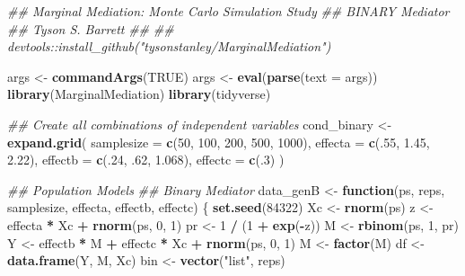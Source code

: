 \documentclass[]{DissertateCUNY}
\newenvironment{Shaded}{\begin{snugshade}}{\end{snugshade}}
\newcommand{\CommentTok}[1]{\textcolor[rgb]{0.56,0.35,0.01}{\textit{#1}}}
\newcommand{\ControlFlowTok}[1]{\textcolor[rgb]{0.13,0.29,0.53}{\textbf{#1}}}
\newcommand{\DataTypeTok}[1]{\textcolor[rgb]{0.13,0.29,0.53}{#1}}
\newcommand{\DecValTok}[1]{\textcolor[rgb]{0.00,0.00,0.81}{#1}}
\newcommand{\FloatTok}[1]{\textcolor[rgb]{0.00,0.00,0.81}{#1}}
\newcommand{\KeywordTok}[1]{\textcolor[rgb]{0.13,0.29,0.53}{\textbf{#1}}}
\newcommand{\NormalTok}[1]{#1}
\newcommand{\OperatorTok}[1]{\textcolor[rgb]{0.81,0.36,0.00}{\textbf{#1}}}
\newcommand{\OtherTok}[1]{\textcolor[rgb]{0.56,0.35,0.01}{#1}}
\newcommand{\StringTok}[1]{\textcolor[rgb]{0.31,0.60,0.02}{#1}}
\begin{document}
\begin{Shaded}
\begin{Highlighting}[]
\CommentTok{## Marginal Mediation: Monte Carlo Simulation Study}
\CommentTok{##   BINARY Mediator}
\CommentTok{## Tyson S. Barrett}
\CommentTok{##}
\CommentTok{## devtools::install_github("tysonstanley/MarginalMediation")}

\NormalTok{args <-}\StringTok{ }\KeywordTok{commandArgs}\NormalTok{(}\OtherTok{TRUE}\NormalTok{)}
\NormalTok{args <-}\StringTok{ }\KeywordTok{eval}\NormalTok{(}\KeywordTok{parse}\NormalTok{(}\DataTypeTok{text =}\NormalTok{ args))}
\KeywordTok{library}\NormalTok{(MarginalMediation)}
\KeywordTok{library}\NormalTok{(tidyverse)}

\CommentTok{## Create all combinations of independent variables}
\NormalTok{cond_binary <-}\StringTok{ }\KeywordTok{expand.grid}\NormalTok{(}
  \DataTypeTok{samplesize =} \KeywordTok{c}\NormalTok{(}\DecValTok{50}\NormalTok{, }\DecValTok{100}\NormalTok{, }\DecValTok{200}\NormalTok{, }\DecValTok{500}\NormalTok{, }\DecValTok{1000}\NormalTok{),}
  \DataTypeTok{effecta =} \KeywordTok{c}\NormalTok{(.}\DecValTok{55}\NormalTok{, }\FloatTok{1.45}\NormalTok{, }\FloatTok{2.22}\NormalTok{),}
  \DataTypeTok{effectb =} \KeywordTok{c}\NormalTok{(.}\DecValTok{24}\NormalTok{, }\FloatTok{.62}\NormalTok{, }\FloatTok{1.068}\NormalTok{),}
  \DataTypeTok{effectc =} \KeywordTok{c}\NormalTok{(.}\DecValTok{3}\NormalTok{)}
\NormalTok{)}

\CommentTok{## Population Models}
\CommentTok{## Binary Mediator}
\NormalTok{data_genB <-}\StringTok{ }\ControlFlowTok{function}\NormalTok{(ps, reps, samplesize, effecta, effectb, effectc) \{}
  \KeywordTok{set.seed}\NormalTok{(}\DecValTok{84322}\NormalTok{)}
\NormalTok{  Xc <-}\StringTok{ }\KeywordTok{rnorm}\NormalTok{(ps)}
\NormalTok{  z <-}\StringTok{ }\NormalTok{effecta }\OperatorTok{*}\StringTok{ }\NormalTok{Xc }\OperatorTok{+}\StringTok{ }\KeywordTok{rnorm}\NormalTok{(ps, }\DecValTok{0}\NormalTok{, }\DecValTok{1}\NormalTok{)}
\NormalTok{  pr <-}\StringTok{ }\DecValTok{1} \OperatorTok{/}\StringTok{ }\NormalTok{(}\DecValTok{1} \OperatorTok{+}\StringTok{ }\KeywordTok{exp}\NormalTok{(}\OperatorTok{-}\NormalTok{z))}
\NormalTok{  M <-}\StringTok{ }\KeywordTok{rbinom}\NormalTok{(ps, }\DecValTok{1}\NormalTok{, pr)}
\NormalTok{  Y <-}\StringTok{ }\NormalTok{effectb }\OperatorTok{*}\StringTok{ }\NormalTok{M }\OperatorTok{+}\StringTok{ }\NormalTok{effectc }\OperatorTok{*}\StringTok{ }\NormalTok{Xc }\OperatorTok{+}\StringTok{ }\KeywordTok{rnorm}\NormalTok{(ps, }\DecValTok{0}\NormalTok{, }\DecValTok{1}\NormalTok{)}
\NormalTok{  M <-}\StringTok{ }\KeywordTok{factor}\NormalTok{(M)}
\NormalTok{  df <-}\StringTok{ }\KeywordTok{data.frame}\NormalTok{(Y, M, Xc)}
\NormalTok{  bin <-}\StringTok{ }\KeywordTok{vector}\NormalTok{(}\StringTok{"list"}\NormalTok{, reps)}


\end{Highlighting}
\end{Shaded}
\end{document}
